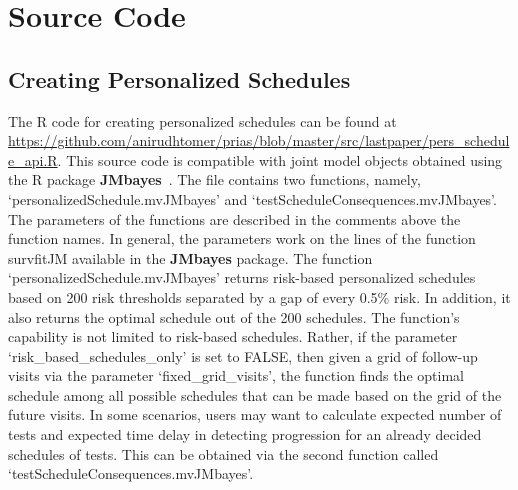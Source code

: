 \section{Source Code}
\label{sec:src}
\subsection{Creating Personalized Schedules}
The R code for creating personalized schedules can be found at \url{https://github.com/anirudhtomer/prias/blob/master/src/lastpaper/pers_schedule_api.R}. This source code is compatible with joint model objects obtained using the R package \textbf{JMbayes}~\citep{rizopoulosJMbayes}. The file contains two functions, namely, `personalizedSchedule.mvJMbayes' and `testScheduleConsequences.mvJMbayes'. The parameters of the functions are described in the comments above the function names. In general, the parameters work on the lines of the function survfitJM available in the \textbf{JMbayes} package. The function  `personalizedSchedule.mvJMbayes' returns risk-based personalized schedules based on 200 risk thresholds separated by a gap of every 0.5\% risk. In addition, it also returns the optimal schedule out of the 200 schedules. The function's capability is not limited to risk-based schedules. Rather, if the parameter `risk\_based\_schedules\_only' is set to FALSE, then given a grid of follow-up visits via the parameter `fixed\_grid\_visits', the function finds the optimal schedule among all possible schedules that can be made based on the grid of the future visits. In some scenarios, users may want to calculate expected number of tests and expected time delay in detecting progression for an already decided schedules of tests. This can be obtained via the second function called `testScheduleConsequences.mvJMbayes'.

